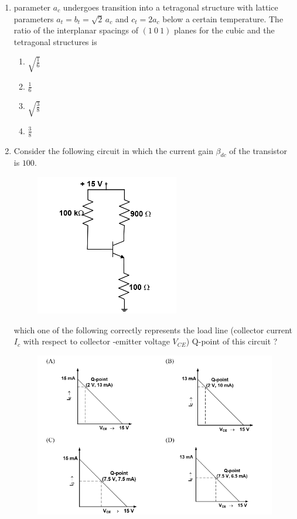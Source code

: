 \documentclass[journal,12pt,onecolumn]{IEEEtran}
\theoremstyle{remark}
\begin{document}
\begin{enumerate}
\item parameter $a_{c}$ undergoes transition into a tetragonal structure with lattice parameters $a_{t}=b_{t}=\sqrt{2}\,a_{c}$ and $c_{t}=2a_{c}$ below a certain temperature. The ratio of the interplanar spacings of $(1\ 0\ 1)$ planes for the cubic and the tetragonal structures is
\begin{multicols}{2}
\begin{enumerate}
\item $\sqrt{\tfrac{1}{6}}$
\item $\tfrac{1}{6}$
\item $\sqrt{\tfrac{3}{8}}$
\item $\tfrac{3}{8}$
\end{enumerate}
\end{multicols}

\item Consider the following circuit in which the current gain $\beta_{dc}$ of the transistor is $100$.
\begin{figure}[H]
    \centering
    \includegraphics[width = 0.3\columnwidth]{fig/Q37(1).png}
    \caption*{}
    \label{fig:Q37(1)}
    \end{figure}
    which one of the following correctly represents the load line (collector current $I_c$ with respect to collector -emitter voltage $V_{CE}$)  Q-point of this circuit ?
    \begin{figure}[H]
    \centering
    \includegraphics[width = 1\columnwidth]{fig/Q37(2).png}

\end{figure}
\end{enumerate}
\end{document}
